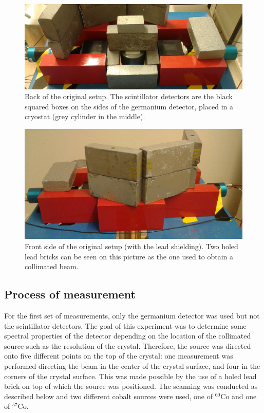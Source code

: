 \documentclass[11pt,a4paper]{article}
\begin{document}
\begin{figure}[!h]
\centering
\includegraphics[scale=0.15]{New_setup_back.jpg}
\caption{Back of the original setup. The scintillator detectors are the black squared boxes on the sides of the germanium detector, placed in a cryostat (grey cylinder in the middle).}
\label{Setup}
\end{figure}

\begin{figure}[!h]
\centering
\includegraphics[scale=0.15]{New_setup_front.jpg}
\caption{Front side of the original setup (with the lead shielding). Two holed lead bricks can be seen on this picture as the one used to obtain a collimated beam.}
\label{Setup_front}
\end{figure}

\subsection{Process of measurement} \label{protocol}

For the first set of measurements, only the germanium detector was used but not the scintillator detectors. The goal of this experiment was to determine some spectral properties of the detector depending on the location of the collimated source such as the resolution of the crystal. Therefore, the source was directed onto five different points on the top of the crystal: one measurement was performed directing the beam in the center of the crystal surface, and four in the corners of the crystal surface. This was made possible by the use of a holed lead brick on top of which the source was positioned. The scanning was conducted as described below and two different cobalt sources were used, one of $^{60}$Co and one of $^{57}$Co.
\end{document}
